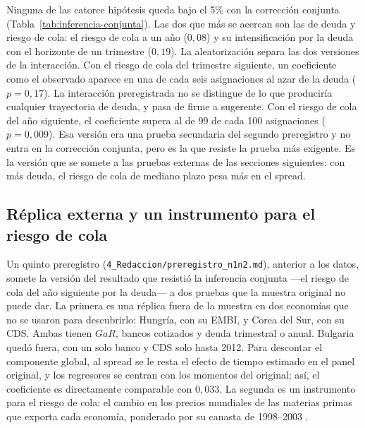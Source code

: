 Ninguna de las catorce hipótesis queda bajo el 5\% con la corrección conjunta (Tabla~\ref{tab:inferencia-conjunta}). Las dos que más se acercan son las de deuda y riesgo de cola: el riesgo de cola a un año ($0{,}08$) y su intensificación por la deuda con el horizonte de un trimestre ($0{,}19$). La aleatorización separa las dos versiones de la interacción. Con el riesgo de cola del trimestre siguiente, un coeficiente como el observado aparece en una de cada seis asignaciones al azar de la deuda ($p=0{,}17$). La interacción preregistrada no se distingue de lo que produciría cualquier trayectoria de deuda, y pasa de firme a sugerente. Con el riesgo de cola del año siguiente, el coeficiente supera al de 99 de cada 100 asignaciones ($p=0{,}009$). Esa versión era una prueba secundaria del segundo preregistro y no entra en la corrección conjunta, pero es la que resiste la prueba más exigente. Es la versión que se somete a las pruebas externas de las secciones siguientes: con más deuda, el riesgo de cola de mediano plazo pesa más en el spread.

\subsection{Réplica externa y un instrumento para el riesgo de cola}
\label{sec:n1n2}

Un quinto preregistro (\texttt{4\_Redaccion/preregistro\_n1n2.md}), anterior a los datos, somete la versión del resultado que resistió la inferencia conjunta ---el riesgo de cola del año siguiente por la deuda--- a dos pruebas que la muestra original no puede dar. La primera es una réplica fuera de la muestra en dos economías que no se usaron para descubrirlo: Hungría, con su EMBI, y Corea del Sur, con su CDS. Ambas tienen $GaR$, bancos cotizados y deuda trimestral o anual. Bulgaria quedó fuera, con un solo banco y CDS solo hasta 2012. Para descontar el componente global, al spread se le resta el efecto de tiempo estimado en el panel original, y los regresores se centran con los momentos del original; así, el coeficiente es directamente comparable con $0{,}033$. La segunda es un instrumento para el riesgo de cola: el cambio en los precios mundiales de las materias primas que exporta cada economía, ponderado por su canasta de 1998--2003 \citep{Gruss2014}.

